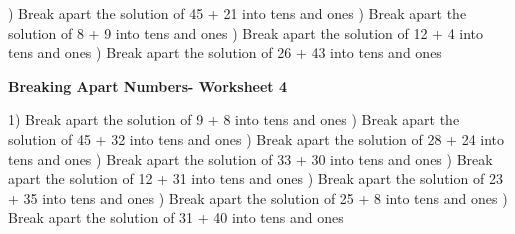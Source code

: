 \documentclass{article}%
\begin{document}
) Break apart the solution of 45 + 21 into tens and ones%
\newline%
\newline%
) Break apart the solution of 8 + 9 into tens and ones%
\newline%
\newline%
) Break apart the solution of 12 + 4 into tens and ones%
\newline%
\newline%
) Break apart the solution of 26 + 43 into tens and ones%
\newline%
\newline%
\newline%
\pagebreak%
\large%
\begin{center}%
\textbf{Breaking Apart Numbers- Worksheet 4}%
\newline%
\end{center} \normalsize%
1) Break apart the solution of 9 + 8 into tens and ones%
\newline%
\newline%
) Break apart the solution of 45 + 32 into tens and ones%
\newline%
\newline%
) Break apart the solution of 28 + 24 into tens and ones%
\newline%
\newline%
) Break apart the solution of 33 + 30 into tens and ones%
\newline%
\newline%
) Break apart the solution of 12 + 31 into tens and ones%
\newline%
\newline%
) Break apart the solution of 23 + 35 into tens and ones%
\newline%
\newline%
) Break apart the solution of 25 + 8 into tens and ones%
\newline%
\newline%
) Break apart the solution of 31 + 40 into tens and ones%
\end{document}
